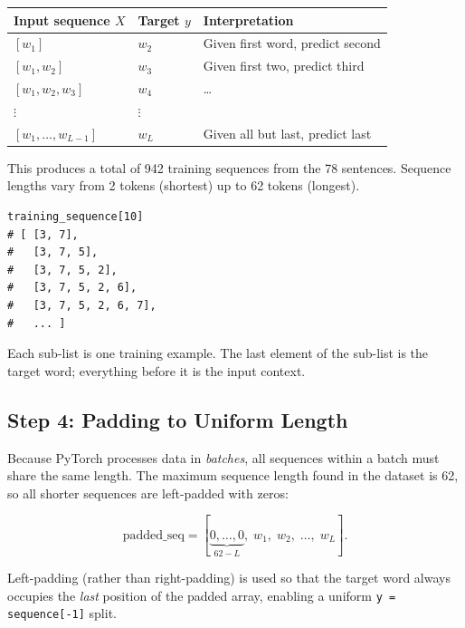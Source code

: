 \documentclass[12pt,a4paper]{article}
\begin{document}
\begin{center}
\begin{tabular}{lll}
\toprule
\textbf{Input sequence $X$}   & \textbf{Target $y$} & \textbf{Interpretation} \\
\midrule
$[w_1]$                       & $w_2$               & Given first word, predict second \\
$[w_1, w_2]$                  & $w_3$               & Given first two, predict third \\
$[w_1, w_2, w_3]$             & $w_4$               & \ldots \\
$\vdots$                      & $\vdots$            & \\
$[w_1, \ldots, w_{L-1}]$      & $w_L$               & Given all but last, predict last \\
\bottomrule
\end{tabular}
\end{center}

This produces a total of 942 training sequences from the 78 sentences.
Sequence lengths vary from 2 tokens (shortest) up to 62 tokens (longest).

\begin{example}[title=Sliding-Window Output for Sentence 10]
\begin{verbatim}
training_sequence[10]
# [ [3, 7],
#   [3, 7, 5],
#   [3, 7, 5, 2],
#   [3, 7, 5, 2, 6],
#   [3, 7, 5, 2, 6, 7],
#   ... ]
\end{verbatim}
Each sub-list is one training example.  The last element of the sub-list is
the target word; everything before it is the input context.
\end{example}

\subsection{Step 4: Padding to Uniform Length}
\label{subsec:padding}

Because PyTorch processes data in \emph{batches}, all sequences within a
batch must share the same length.  The maximum sequence length found in the
dataset is 62, so all shorter sequences are left-padded with zeros:

\[
  \text{padded\_seq} = [\underbrace{0,\ldots,0}_{62-L},\; w_1,\; w_2,\; \ldots,\; w_L].
\]

Left-padding (rather than right-padding) is used so that the target word
always occupies the \emph{last} position of the padded array, enabling a
uniform \texttt{y = sequence[-1]} split.
\end{document}
